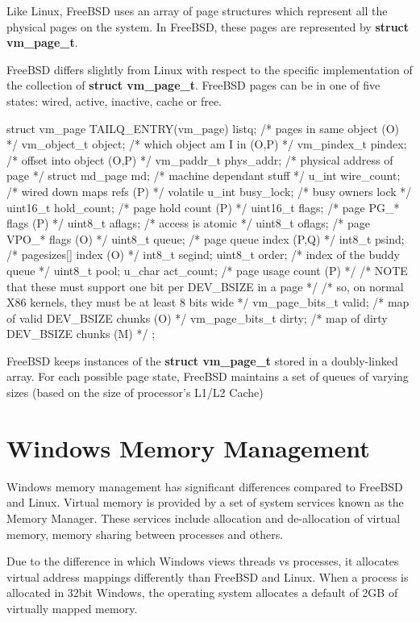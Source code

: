 Like Linux, FreeBSD uses an array of page structures which represent all the physical pages on the system.  In FreeBSD, these pages are represented by \textbf{struct vm\_page\_t}.  

FreeBSD differs slightly from Linux with respect to the specific implementation of the collection of \textbf{struct vm\_page\_t}.  FreeBSD pages can be in one of five states: wired, active, inactive, cache or free.

\code{}
struct vm_page {
	TAILQ_ENTRY(vm_page) listq;	/* pages in same object (O) */
	vm_object_t object;		/* which object am I in (O,P) */
	vm_pindex_t pindex;		/* offset into object (O,P) */
	vm_paddr_t phys_addr;		/* physical address of page */
	struct md_page md;		/* machine dependant stuff */
	u_int wire_count;		/* wired down maps refs (P) */
	volatile u_int busy_lock;	/* busy owners lock */
	uint16_t hold_count;		/* page hold count (P) */
	uint16_t flags;			/* page PG_* flags (P) */
	uint8_t aflags;			/* access is atomic */
	uint8_t oflags;			/* page VPO_* flags (O) */
	uint8_t	queue;			/* page queue index (P,Q) */
	int8_t psind;			/* pagesizes[] index (O) */
	int8_t segind;
	uint8_t	order;			/* index of the buddy queue */
	uint8_t pool;
	u_char	act_count;		/* page usage count (P) */
	/* NOTE that these must support one bit per DEV_BSIZE in a page */
	/* so, on normal X86 kernels, they must be at least 8 bits wide */
	vm_page_bits_t valid;		/* map of valid DEV_BSIZE chunks (O) */
	vm_page_bits_t dirty;		/* map of dirty DEV_BSIZE chunks (M) */
};
\endcode{}

FreeBSD keeps instances of the \textbf{struct vm\_page\_t} stored in a doubly-linked array.  For each possible page state, FreeBSD maintains a set of queues of varying sizes (based on the size of processor's L1/L2 Cache)

\section{Windows Memory Management}

Windows memory management has significant differences compared to FreeBSD and Linux.  Virtual memory is provided by a set of system services known as the Memory Manager.  These services include allocation and de-allocation of virtual memory, memory sharing between processes and others.

Due to the difference in which Windows views threads vs processes, it allocates virtual address mappings differently than FreeBSD and Linux.  When a process is allocated in 32bit Windows, the operating system allocates a default of 2GB of virtually mapped memory.

